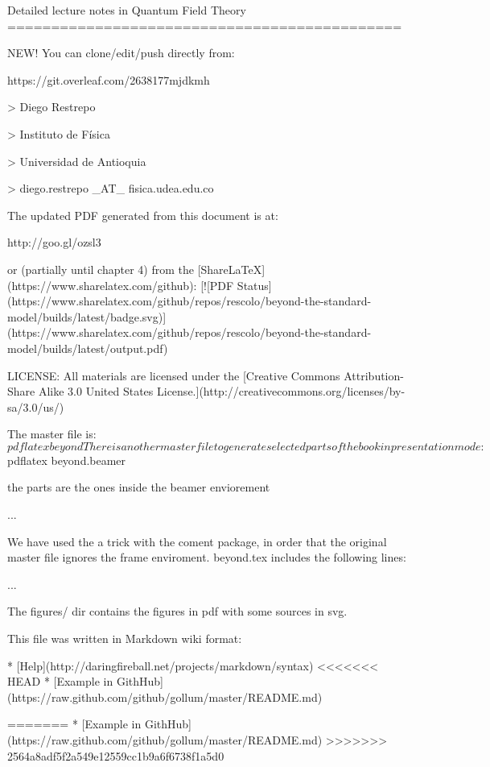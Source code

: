 Detailed lecture notes in Quantum Field Theory
=============================================

NEW!
You can clone/edit/push directly from:

https://git.overleaf.com/2638177mjdkmh


> Diego Restrepo

> Instituto de Física

> Universidad de Antioquia

> diego.restrepo _AT_ fisica.udea.edu.co

The updated PDF generated from this document is at:

http://goo.gl/ozsl3

or (partially until chapter 4) from the [ShareLaTeX](https://www.sharelatex.com/github): [![PDF Status](https://www.sharelatex.com/github/repos/rescolo/beyond-the-standard-model/builds/latest/badge.svg)](https://www.sharelatex.com/github/repos/rescolo/beyond-the-standard-model/builds/latest/output.pdf)

LICENSE: All materials are licensed under the [Creative Commons Attribution-Share Alike 3.0 United States License.](http://creativecommons.org/licenses/by-sa/3.0/us/)

The master file is:
    $ pdflatex beyond

There is another master file to generate selected parts of the book in
presentation mode:

    $ pdflatex beyond.beamer


the parts are the ones inside the beamer enviorement

    \begin{frame}
    ...
    \end{frame}

We have used the a trick with the coment package, in order that the
original master file ignores the frame enviroment. beyond.tex includes
the following lines:

    \usepackage{comment}
    ...	
    {\begingroup}{\endgroup}

The figures/ dir contains the figures in pdf with some sources in svg.

This file was written in Markdown wiki format: 

* [Help](http://daringfireball.net/projects/markdown/syntax)
<<<<<<< HEAD
* [Example in GithHub](https://raw.github.com/github/gollum/master/README.md)



=======
* [Example in GithHub](https://raw.github.com/github/gollum/master/README.md)
>>>>>>> 2564a8adf5f2a549e12559cc1b9a6f6738f1a5d0